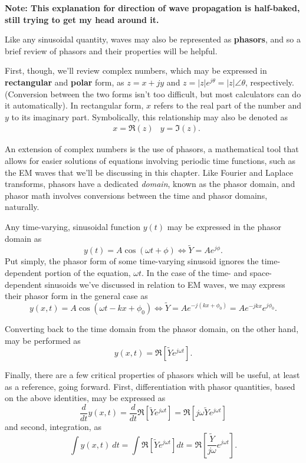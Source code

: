 \documentclass{article}
\begin{document}
\textbf{Note: This explanation for direction of wave propagation is half-baked, still trying to get my head around it.}

Like any sinusoidal quantity, waves may also be represented as \textbf{phasors}, and so a brief review of phasors and their properties will be helpful. 

First, though, we'll review complex numbers, which may be expressed in \textbf{rectangular} and \textbf{polar} form, as \(z = x + jy\) and \(z = |z|e^{j\theta} = |z|\angle{\theta}\), respectively. (Conversion between the two forms isn't too difficult, but most calculators can do it automatically). In rectangular form, \(x\) refers to the real part of the number and \(y\) to its imaginary part. Symbolically, this relationship may also be denoted as
\begin{align*}
	&x = \Re{(z)} &y = \Im{(z)}.
\end{align*}

An extension of complex numbers is the use of phasors, a mathematical tool that allows for easier solutions of equations involving periodic time functions, such as the EM waves that we'll be discussing in this chapter. Like Fourier and Laplace transforms, phasors have a dedicated \textit{domain}, known as the phasor domain, and phasor math involves conversions between the time and phasor domains, naturally.

Any time-varying, sinusoidal function \(y(t)\) may be expressed in the phasor domain as 
\[
	y(t) = A\cos{(\omega t + \phi)} \Leftrightarrow \widetilde{Y} = Ae^{j\phi}.
\]
Put simply, the phasor form of some time-varying sinusoid ignores the time-dependent portion of the equation, \(\omega t\). In the case of the time- and space-dependent sinusoids we've discussed in relation to EM waves, we may express their phasor form in the general case as
\[
	y(x,t) = A\cos{(\omega t - kx + \phi_0)} \Leftrightarrow \widetilde{Y} = Ae^{-j(kx + \phi_0)} = Ae^{-jkx}e^{j\phi_0}.
\]

Converting back to the time domain from the phasor domain, on the other hand, may be performed as
\[
	y(x,t) = \Re{\left[\widetilde{Y}e^{j\omega t}\right]}.
\]

Finally, there are a few critical properties of phasors which will be useful, at least as a reference, going forward. First, differentiation with phasor quantities, based on the above identities, may be expressed as
\[
	\frac{d}{dt}y(x,t) = \frac{d}{dt}\Re{\left[\widetilde{Y}e^{j\omega t}\right]} = \Re{\left[j\omega\widetilde{Y}e^{j\omega t}\right]} 
\]
and second, integration, as
\[
	\int y(x,t) \ dt = \int \Re{\left[\widetilde{Y}e^{j\omega t}\right]} dt = \Re{\left[\frac{\widetilde{Y}}{j\omega}e^{j \omega t}\right]}.
\]
\end{document}
